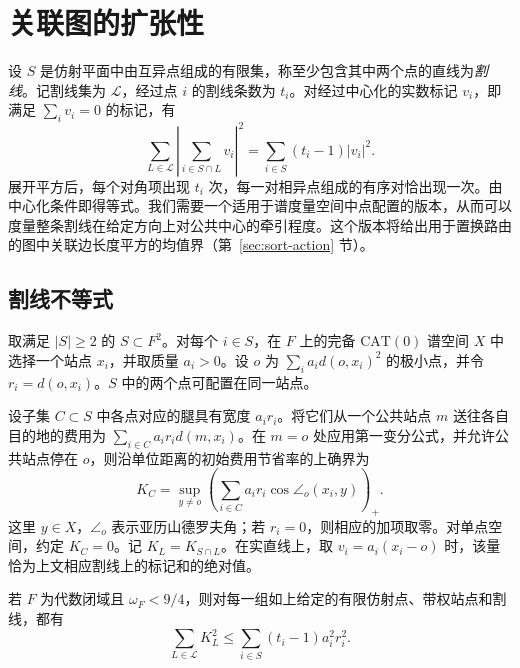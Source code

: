 \section{关联图的扩张性}\label{sec:incidence}

设 $S$ 是仿射平面中由互异点组成的有限集，称至少包含其中两个点的直线为\emph{割线}。记割线集为 $\mathcal L$，经过点 $i$ 的割线条数为 $t_i$。对经过中心化的实数标记 $v_i$，即满足 $\sum_i v_i=0$ 的标记，有
\[
 \sum_{L\in\mathcal L}\left|\sum_{i\in S\cap L}v_i\right|^2
       =\sum_{i\in S}(t_i-1)|v_i|^2 .
\]
展开平方后，每个对角项出现 $t_i$ 次，每一对相异点组成的有序对恰出现一次。由中心化条件即得等式。我们需要一个适用于谱度量空间中点配置的版本，从而可以度量整条割线在给定方向上对公共中心的牵引程度。这个版本将给出用于置换路由的图中关联边长度平方的均值界（第~\ref{sec:sort-action} 节）。

\subsection{割线不等式}

取满足 $|S|\ge2$ 的 $S\subset F^2$。对每个 $i\in S$，在 $F$ 上的完备 $\mathrm{CAT}(0)$ 谱空间 $X$ 中选择一个站点 $x_i$，并取质量 $a_i>0$。设 $o$ 为 $\sum_i a_i d(o,x_i)^2$ 的极小点，并令 $r_i=d(o,x_i)$。$S$ 中的两个点可配置在同一站点。

设子集 $C\subset S$ 中各点对应的腿具有宽度 $a_i r_i$。将它们从一个公共站点 $m$ 送往各自目的地的费用为 $\sum_{i\in C}a_i r_i d(m,x_i)$。在 $m=o$ 处应用第一变分公式，并允许公共站点停在 $o$，则沿单位距离的初始费用节省率的上确界为
\[
 K_C=\sup_{y\ne o}
       \left(\sum_{i\in C}a_i r_i\cos\angle_o(x_i,y)\right)_+ .
\]
这里 $y\in X$，$\angle_o$ 表示亚历山德罗夫角；若 $r_i=0$，则相应的加项取零。对单点空间，约定 $K_C=0$。记 $K_L=K_{S\cap L}$。在实直线上，取 $v_i=a_i(x_i-o)$ 时，该量恰为上文相应割线上的标记和的绝对值。

\begin{theorem}[关联不等式]\label{thm:incidence}
若 $F$ 为代数闭域且 $\omega_F<9/4$，则对每一组如上给定的有限仿射点、带权站点和割线，都有
\begin{equation}\label{eq:inc-secants}
       \sum_{L\in\mathcal L}K_L^2
          \le \sum_{i\in S}(t_i-1)a_i^2r_i^2 .
\end{equation}
\end{theorem}

